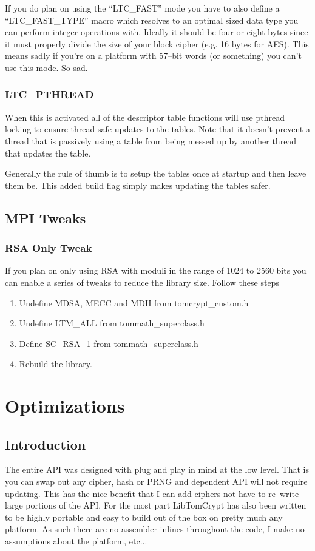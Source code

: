 \documentclass[a4paper]{book}
\begin{document}
If you do plan on using the ``LTC\_FAST'' mode you have to also define a ``LTC\_FAST\_TYPE'' macro which resolves to an optimal sized
data type you can perform integer operations with.  Ideally it should be four or eight bytes since it must properly divide the size 
of your block cipher (e.g. 16 bytes for AES).  This means sadly if you're on a platform with 57--bit words (or something) you can't 
use this mode.  So sad.

\subsection{LTC\_PTHREAD}
When this is activated all of the descriptor table functions will use pthread locking to ensure thread safe updates to the tables.  Note that 
it doesn't prevent a thread that is passively using a table from being messed up by another thread that updates the table.

Generally the rule of thumb is to setup the tables once at startup and then leave them be.  This added build flag simply makes updating
the tables safer.

\section{MPI Tweaks}
\subsection{RSA Only Tweak}
If you plan on only using RSA with moduli in the range of 1024 to 2560 bits you can enable a series of tweaks
to reduce the library size.  Follow these steps

\begin{enumerate}
   \item Undefine MDSA, MECC and MDH from tomcrypt\_custom.h
   \item Undefine LTM\_ALL  from tommath\_superclass.h
   \item Define SC\_RSA\_1 from tommath\_superclass.h
   \item Rebuild the library.
\end{enumerate}

\chapter{Optimizations}
\section{Introduction}
The entire API was designed with plug and play in mind at the low level.  That is you can swap out any cipher, hash or PRNG and dependent API will not require
updating.  This has the nice benefit that I can add ciphers not have to re--write large portions of the API.  For the most part LibTomCrypt has also been written
to be highly portable and easy to build out of the box on pretty much any platform.  As such there are no assembler inlines throughout the code, I make no assumptions
about the platform, etc...
\end{document}
